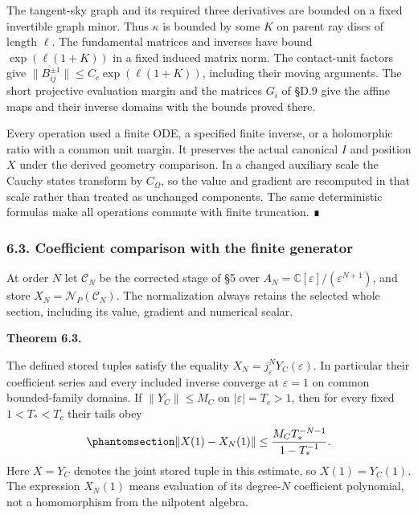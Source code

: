 \documentclass[
  english,
  11pt,
  reqno]{amsart}
\makeatletter
\newcommand{\pandocstatementheading}[1]{%
  \par\addpenalty{\@beginparpenalty}%
  \addvspace{.5\baselineskip plus .2\baselineskip minus .2\baselineskip}%
  {\normalfont\bfseries #1\par}%
  \nobreak\@afterindenttrue\@afterheading
}
\makeatother
\begin{document}
The tangent-sky graph and its required three derivatives are bounded on
a fixed invertible graph minor. Thus \(\kappa\) is bounded by some \(K\)
on parent ray discs of length \(\ell\). The fundamental matrices and
inverses have bound \(\exp(\ell(1+K))\) in a fixed induced matrix norm.
The contact-unit factors give
\(\|B_{ij}^{\pm1}\|\le C_c\exp(\ell(1+K))\), including their moving
arguments. The short projective evaluation margin and the matrices
\(G_i\) of §D.9 give the affine maps and their inverse domains with the
bounds proved there.

Every operation used a finite ODE, a specified finite inverse, or a
holomorphic ratio with a common unit margin. It preserves the actual
canonical \(I\) and position \(X\) under the derived geometry
comparison. In a changed auxiliary scale the Cauchy states transform by
\(C_\Omega\), so the value and gradient are recomputed in that scale
rather than treated as unchanged components. The same deterministic
formulas make all operations commute with finite truncation. ∎

\protect{}\label{sec:gg-literal-convergence}

\subsubsection{6.3. Coefficient comparison with the finite
generator}\label{literal-comparison-with-the-finite-generator}

At order \(N\) let \(\mathcal C_N\) be the corrected stage of §5 over
\(A_N=\mathbb C[\varepsilon]/(\varepsilon^{N+1})\), and store
\(X_N=\mathcal N_P(\mathcal C_N)\). The normalization always retains the
selected whole section, including its value, gradient and numerical
scalar.

\pandocstatementheading{\protect{}\label{thm:gg-literal-stored-convergence}Theorem 6.3.}

The defined stored tuples satisfy the equality
\(X_N=j_\varepsilon^NY_C(\varepsilon)\). In particular their coefficient
series and every included inverse converge at \(\varepsilon=1\) on
common bounded-family domains. If \(\|Y_C\|\le M_C\) on
\(|\varepsilon|=T_c>1\), then for every fixed \(1<T_*<T_c\) their tails
obey
\begin{equation}\protect\phantomsection\label{eq:gg-literal-convergence-tail}{
 \|X(1)-X_N(1)\|
 \le \frac{M_CT_*^{-N-1}}{1-T_*^{-1}} .
}\end{equation} Here \(X=Y_C\) denotes the joint stored tuple in this
estimate, so \(X(1)=Y_C(1)\). The expression \(X_N(1)\) means evaluation
of its degree-\(N\) coefficient polynomial, not a homomorphism from the
nilpotent algebra.
\end{document}
